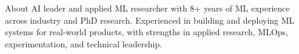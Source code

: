 \begin{rubric}{About}
\entry*[\relax]
	AI leader and applied ML researcher with 8+ years of ML experience across industry and PhD research. Experienced in building and deploying ML systems for real-world products, with strengths in applied research, MLOps, experimentation, and technical leadership.
\end{rubric}


